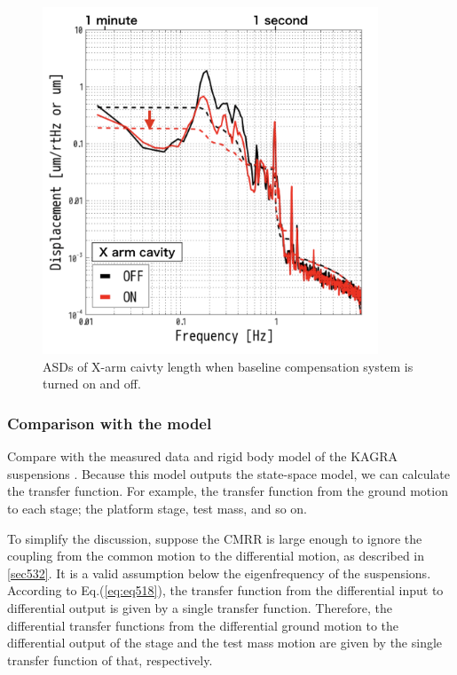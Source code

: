 \begin{figure}[h]
  \centering
  \includegraphics[width=10cm]{./img_chap6/img611.png}
  \caption{ASDs of X-arm caivty length when baseline compensation system is turned on and off. }\label{img:img611}
\end{figure}

\subsubsection{Comparison with the model}
Compare with the measured data and rigid body model of the KAGRA suspensions \cite{sekiguchi2016astudy}. Because this model outputs the state-space model, we can calculate the transfer function. For example, the transfer function from the ground motion to each stage; the platform stage, test mass, and so on.

To simplify the discussion, suppose the CMRR is large enough to ignore the coupling from the common motion to the differential motion, as described in \cref{sec532}. It is a valid assumption below the eigenfrequency of the suspensions. According to Eq.(\ref{eq:eq518}), the transfer function from the differential input to differential output is given by a single transfer function. Therefore, the differential transfer functions from the differential ground motion to the differential output of the stage and the test mass motion are given by the single transfer function of that, respectively.

